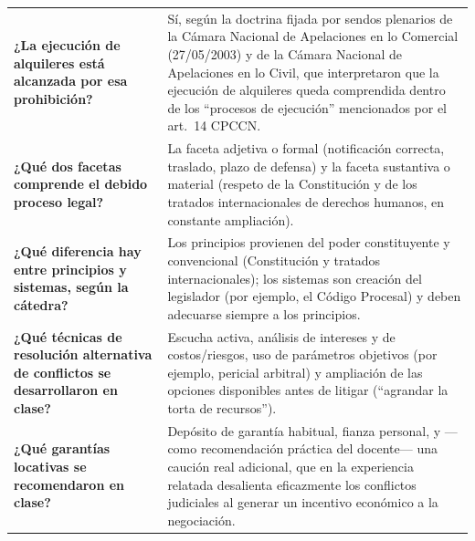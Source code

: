 \documentclass[12pt,oneside]{book}
\begin{document}
\begin{longtable}{p{} p{}}
\textbf{¿La ejecución de alquileres está alcanzada por esa prohibición?} &
Sí, según la doctrina fijada por sendos plenarios de la Cámara Nacional de Apelaciones en lo Comercial (27/05/2003) y de la Cámara Nacional de Apelaciones en lo Civil, que interpretaron que la ejecución de alquileres queda comprendida dentro de los ``procesos de ejecución'' mencionados por el art.\ 14 CPCCN. \\

\textbf{¿Qué dos facetas comprende el debido proceso legal?} &
La faceta adjetiva o formal (notificación correcta, traslado, plazo de defensa) y la faceta sustantiva o material (respeto de la Constitución y de los tratados internacionales de derechos humanos, en constante ampliación). \\

\textbf{¿Qué diferencia hay entre principios y sistemas, según la cátedra?} &
Los principios provienen del poder constituyente y convencional (Constitución y tratados internacionales); los sistemas son creación del legislador (por ejemplo, el Código Procesal) y deben adecuarse siempre a los principios. \\

\textbf{¿Qué técnicas de resolución alternativa de conflictos se desarrollaron en clase?} &
Escucha activa, análisis de intereses y de costos/riesgos, uso de parámetros objetivos (por ejemplo, pericial arbitral) y ampliación de las opciones disponibles antes de litigar (``agrandar la torta de recursos''). \\

\textbf{¿Qué garantías locativas se recomendaron en clase?} &
Depósito de garantía habitual, fianza personal, y —como recomendación práctica del docente— una caución real adicional, que en la experiencia relatada desalienta eficazmente los conflictos judiciales al generar un incentivo económico a la negociación. \\


\end{longtable}
\end{document}
